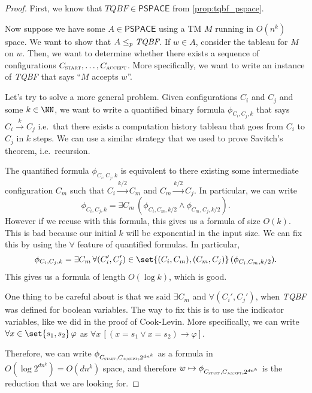 \documentclass{standalone}
\begin{document}
\begin{proof}
  First, we know that \(\textit{TQBF} \in \mathsf{PSPACE}\)
  from \cref{prop:tqbf_pspace}.
  
  Now suppose we have some \(A \in \mathsf{PSPACE}\) using
  a \textsf{TM} \(M\) running in \(O(n^k)\) space.
  We want to show that \(A \mathrel{\leq_p} \textit{TQBF}\).
  If \(w \in A\), consider the tableau for \(M\) on \(w\).
  Then, we want to determine whether there exists a sequence of configurations
  \(C_{\textsc{start}}, \dots, C_{\textsc{accept}}\).
  More specifically, we want to write an instance of \textit{TQBF}
  that says ``\(M\) accepts \(w\)''.

  Let's try to solve a more general problem.
  Given configurations \(C_i\) and \(C_j\) and some \(k \in \NN\),
  we want to write a quantified binary formula \(\phi_{C_i, C_j, k}\)
  that says \(C_i \stackrel{k}{\to} C_j\) i.e.\ that there exists
  a computation history tableau that goes from
  \(C_i\) to \(C_j\) in \(k\) steps.
  We can use a similar strategy that we used
  to prove Savitch's theorem, i.e.\ recursion.

  The quantified formula \(\phi_{C_i, C_j, k}\) is equivalent to
  there existing some intermediate configuration \(C_m\)
  such that \(C_i \xrightarrow{k/2} C_m\) and \(C_m \xrightarrow{k/2} C_j\).
  In particular, we can write
  \[
    \phi_{C_i, C_j, k} =
      \exists C_m \, (
        \phi_{C_i, C_m, k/2} \land
        \phi_{C_m, C_j, k/2}
      ).
  \]
  However if we recuse with this formula,
  this gives us a formula of size \(O(k)\).
  This is bad because our initial \(k\) will be exponential in the input size.
  We can fix this by using the \(\forall\) feature of quantified formulas.
  In particular,
  \[
    \phi_{C_i, C_j, k} =
      \exists C_m \, \forall (C_i', C_j') \in \set{(C_i, C_m), (C_m, C_j)} \, (
        \phi_{C_i, C_m, k/2}
      ).
  \]
  This gives us a formula of length \(O(\log k)\), which is good.

  One thing to be careful about is that we said
  \(\exists C_m\) and \(\forall(C_i', C_j')\),
  when \textit{TQBF} was defined for boolean variables.
  The way to fix this is to use the indicator variables,
  like we did in the proof of Cook-Levin.
  More specifically, we can write \(\forall x \in \set{s_1, s_2}\, \varphi\)
  as \(\forall x \, [(x = s_1 \lor x = s_2) \rightarrow \varphi]\).

  Therefore, we can write
  \(\phi_{C_{\textsc{start}}, C_{\textsc{accept}}, 2^{d n^k}}\) as a formula
  in \(O(\log 2^{d n^k}) = O(d n^k)\) space, and therefore
  \(w \mapsto \phi_{C_{\textsc{start}}, C_{\textsc{accept}}, 2^{d n^k}}\)
  is the reduction that we are looking for.
\end{proof}
\end{document}
